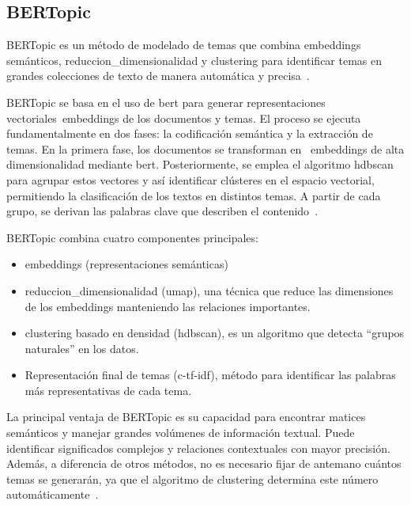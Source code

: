 \subsection{BERTopic}\label{sec:bertopic}

BERTopic es un método de modelado de temas que combina \gls{embeddings}
semánticos, \gls{reduccion_dimensionalidad} y \gls{clustering} para identificar
temas en grandes colecciones de texto de manera automática y
precisa~\cite{grootendorstBERTopicNeuralTopic2022}.

BERTopic se basa en el uso de \acrfull{bert} para generar representaciones
vectoriales~\gls{embeddings} de los documentos y temas. El proceso se ejecuta
fundamentalmente en dos fases: la codificación semántica y la extracción de
temas. En la primera fase, los documentos se transforman en ~\gls{embeddings}
de alta dimensionalidad mediante \acrshort{bert}. Posteriormente, se emplea el
algoritmo \acrshort{hdbscan} para agrupar estos vectores y así identificar
clústeres en el espacio vectorial, permitiendo la clasificación de los textos
en distintos temas. A partir de cada grupo, se derivan las palabras clave que
describen el contenido~\cite{gan2023experimental}.

BERTopic combina cuatro componentes principales:

\begin{itemize}
	\item \gls{embeddings} (representaciones semánticas)
	\item \gls{reduccion_dimensionalidad} (\acrshort{umap}), una técnica que reduce las
	      dimensiones de los \gls{embeddings} manteniendo las relaciones importantes.
	\item \gls{clustering} basado en densidad (\acrshort{hdbscan}), es un algoritmo que detecta “grupos naturales” en los datos.
	\item Representación final de temas (\acrshort{c-tf-idf}), método para identificar
	      las palabras más representativas de cada tema.
\end{itemize}

La principal ventaja de BERTopic es su capacidad para encontrar matices
semánticos y manejar grandes volúmenes de información textual. Puede
identificar significados complejos y relaciones contextuales con mayor
precisión. Además, a diferencia de otros métodos, no es necesario fijar de
antemano cuántos temas se generarán, ya que el algoritmo de \gls{clustering}
determina este número automáticamente~\cite{gan2023experimental}.

